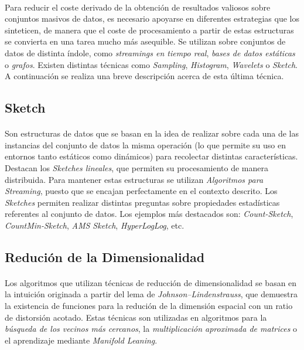 \documentclass{subfiles}
\begin{document}
        \paragraph{}
        Para reducir el coste derivado de la obtención de resultados valiosos sobre conjuntos masivos de datos, es necesario apoyarse en diferentes estrategias que los sinteticen, de manera que el coste de procesamiento a partir de estas estructuras se convierta en una tarea mucho más asequible. Se utilizan sobre conjuntos de datos de distinta índole, como \emph{streamings en tiempo real}, \emph{bases de datos estáticas} o \emph{grafos}. Existen distintas técnicas como \emph{Sampling}, \emph{Histogram}, \emph{Wavelets} o \emph{Sketch}. A continuación se realiza una breve descripción acerca de esta última técnica.

        \subsection{Sketch}

          \paragraph{}
          Son estructuras de datos que se basan en la idea de realizar sobre cada una de las instancias del conjunto de datos la misma operación (lo que permite su uso en entornos tanto estáticos como dinámicos) para recolectar distintas características. Destacan los \emph{Sketches lineales}, que permiten su procesamiento de manera distribuida. Para mantener estas estructuras se utilizan \emph{Algoritmos para Streaming}, puesto que se encajan perfectamente en el contexto descrito. Los \emph{Sketches} permiten realizar distintas preguntas sobre propiedades estadísticas referentes al conjunto de datos. Los ejemplos más destacados son: \emph{Count-Sketch}, \emph{CountMin-Sketch}, \emph{AMS Sketch}, \emph{HyperLogLog}, etc.

      \subsection{Redución de la Dimensionalidad}

        \paragraph{}
        Los algoritmos que utilizan técnicas de reducción de dimensionalidad se basan en la intuición originada a partir del lema de \emph{Johnson–Lindenstrauss}, que demuestra la existencia de funciones para la redución de la dimensión espacial con un ratio de distorsión acotado. Estas técnicas son utilizadas en algoritmos para la \emph{búsqueda de los vecinos más cercanos}, la \emph{multiplicación aproximada de matrices} o el aprendizaje mediante \emph{Manifold Leaning}.
\end{document}

